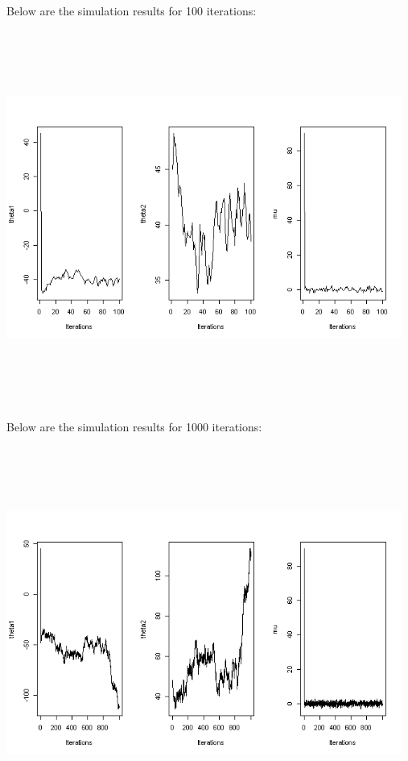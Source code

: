 \documentclass[10pt,a4paper]{article}
\begin{document}
Below are the simulation results for 100 iterations:\\
\includegraphics[width=13cm,height=13cm,keepaspectratio]{./images/p1c_100}\\
Below are the simulation results for 1000 iterations:\\
\includegraphics[width=13cm,height=13cm,keepaspectratio]{./images/p1c_1000}\\
\end{document}
